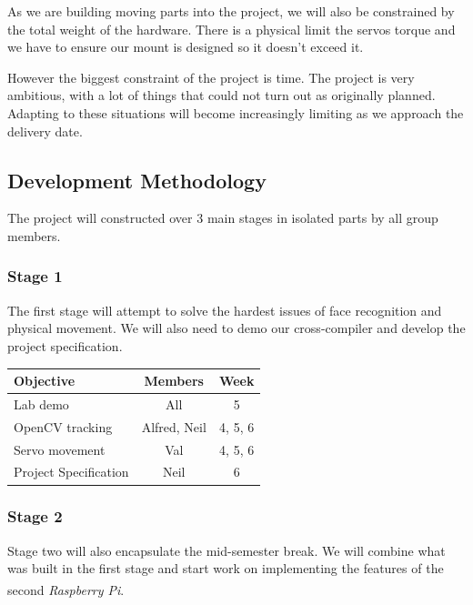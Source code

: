 \documentclass[11pt,a4paper,titlepage]{report}
\newcommand{\rpi}{\textit{Raspberry Pi\textsuperscript{\textregistered}}}
\begin{document}
As we are building moving parts into the project, we will also be constrained by the total weight of the hardware. There is a physical limit the servos torque and we have to ensure our mount is designed so it doesn't exceed it.

However the biggest constraint of the project is time. The project is very ambitious, with a lot of things that could not turn out as originally planned. Adapting to these situations will become increasingly limiting as we approach the delivery date.


\subsection{Development Methodology}

The project will constructed over 3 main stages in isolated parts by all group members. 


\subsubsection{Stage 1}

The first stage will attempt to solve the hardest issues of face recognition and physical movement. We will also need to demo our cross-compiler and develop the project specification.

\begin{table}[H]
\begin{tabular}{|l|c|c|}
    \hline
    \textbf{Objective} & \textbf{Members} & \textbf{Week} \\ \hline
    
    Lab demo & All & 5 \\ \hline
    OpenCV tracking & Alfred, Neil & 4, 5, 6 \\ \hline
    Servo movement & Val & 4, 5, 6 \\ \hline
    Project Specification & Neil & 6 \\ \hline

\end{tabular}
\end{table}

\subsubsection{Stage 2}

Stage two will also encapsulate the mid-semester break. We will combine what was built in the first stage and start work on implementing the features of the second \rpi.
\end{document}
